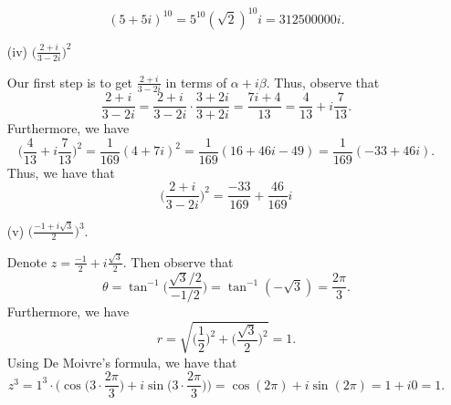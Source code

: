 \documentclass[a4paper]{article}
\begin{document}
\begin{enumerate}
\begin{solution}
                \[  (5 + 5i)^{10} = 5^{10} (\sqrt{ 2 } )^{10} i = 312500000 i. \]
            \end{solution}
            \item[(iv)] \( \Big(  \frac{ 2 + i  }{ 3 -2i }  \Big)^{2} \)
                \begin{solution}
                Our first step is to get \( \frac{ 2 + i  }{  3 -2i }  \) in terms of \( \alpha + i \beta  \). Thus, observe that
                \[  \frac{ 2 + i  }{ 3 - 2i } = \frac{ 2 + i  }{ 3 - 2i } \cdot \frac{ 3 + 2i }{ 3 + 2i } = \frac{ 7i + 4  }{ 13 } = \frac{ 4 }{ 13 }  + i \frac{ 7 }{ 13 }.    \]
               Furthermore, we have 
               \[  \Big(  \frac{ 4 }{ 13 } + i \frac{ 7 }{ 13 }  \Big)^{2} = \frac{ 1 }{ 169 } ( 4 + 7i)^{2} = \frac{ 1 }{ 169  } (16 + 46i - 49) = \frac{ 1 }{ 169  }(-33 + 46i).    \]
               Thus, we have that 
               \[  \Big(  \frac{ 2 + i  }{ 3 -2i }  \Big)^{2} = \frac{ -33 }{ 169  } + \frac{ 46 }{ 169 }i  \]
                \end{solution}
            \item[(v)] \( \Big(  \frac{ - 1 + i \sqrt{ 3 }  }{ 2 }  \Big)^{3} \).
                \begin{solution}
                   Denote \( z = \frac{ -1 }{ 2 }  + i \frac{ \sqrt{ 3 }  }{ 2 }  \). Then observe that  
                   \[  \theta = \tan^{-1} \Big(  \frac{ \sqrt{ 3 } / 2 }{ -1 / 2 }  \Big) = \tan^{-1}(- \sqrt{ 3 } ) = \frac{ 2 \pi  }{ 3 }.   \]
                   Furthermore, we have
                   \[  r = \sqrt{ \Big(  \frac{ 1 }{ 2 }  \Big)^{2} + \Big(  \frac{ \sqrt{ 3 }  }{ 2 }  \Big)^{2} } = 1.   \]
                   Using De Moivre's formula, we have that 
                   \[  z^{3} = 1^{3} \cdot \Big(  \cos \Big( 3 \cdot \frac{ 2 \pi  }{ 3 }    \Big) + i \sin \Big(  3 \cdot \frac{ 2 \pi  }{ 3 }  \Big) \Big) = \cos(2 \pi) + i \sin(2 \pi ) = 1 + i0 = 1.  \]
                \end{solution}
        \end{enumerate}
\end{document}

